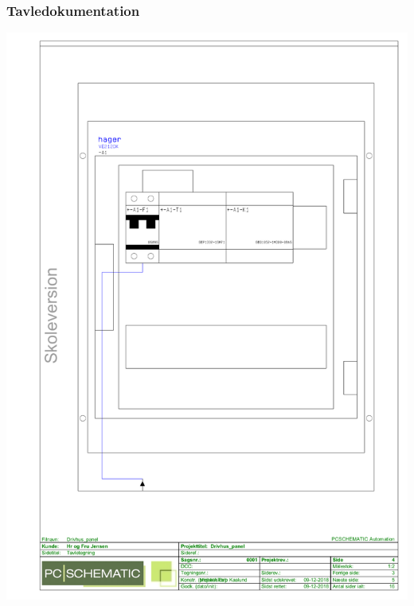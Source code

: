 \subsubsection{Tavledokumentation}
\includegraphics[scale=0.72]{appendix/Drivhus_panel_5.pdf}
\newpage

